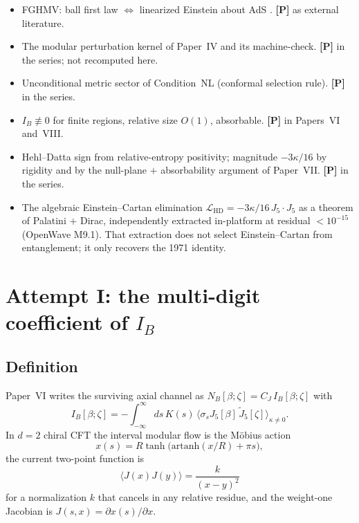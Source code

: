 \documentclass[11pt]{article}
\theoremstyle{definition}
\newcommand{\pP}{\textbf{[P]}}
\newcommand{\IB}{I_B}
\newcommand{\LHD}{\mathcal{L}_{\mathrm{HD}}}
\begin{document}
\begin{itemize}[leftmargin=1.4em]
\item FGHMV: ball first law $\Leftrightarrow$ linearized Einstein about
AdS \cite{FGHMV2014}. \pP{} as external literature.
\item The modular perturbation kernel of Paper~IV and its
machine-check. \pP{} in the series; not recomputed here.
\item Unconditional metric sector of Condition~NL (conformal selection
rule). \pP{} in the series.
\item $\IB\not\equiv 0$ for finite regions, relative size $O(1)$,
absorbable. \pP{} in Papers~VI and~VIII.
\item Hehl--Datta sign from relative-entropy positivity; magnitude
$-3\kappa/16$ by rigidity and by the null-plane $+$ absorbability
argument of Paper~VII. \pP{} in the series.
\item The algebraic Einstein--Cartan elimination
$\LHD=-3\kappa/16\,J_5\cdot J_5$ as a theorem of Palatini $+$ Dirac,
independently extracted in-platform at residual $<10^{-15}$
(OpenWave M9.1). That extraction does not select Einstein--Cartan
from entanglement; it only recovers the 1971 identity.
\end{itemize}

\section{Attempt I: the multi-digit coefficient of $\IB$}
\label{sec:ib}

\subsection{Definition}

Paper~VI writes the surviving axial channel as
$N_B[\beta;\zeta]=C_J\,\IB[\beta;\zeta]$ with
\begin{equation}
\IB[\beta;\zeta]
=
-\int_{-\infty}^{\infty} ds\,
K(s)\,
\bigl\langle
\sigma_s J_5[\beta]\,
\widetilde{J}_5[\zeta]
\bigr\rangle_{\kappa\neq 0}.
\label{eq:IB}
\end{equation}
In $d=2$ chiral CFT the interval modular flow is the M\"obius action
\cite{McGwierVI}
\begin{equation}
x(s)=R\tanh\bigl(\mathrm{artanh}(x/R)+\pi s\bigr),
\label{eq:flow}
\end{equation}
the current two-point function is
\begin{equation}
\langle J(x)J(y)\rangle = \frac{k}{(x-y)^2}
\label{eq:JJ}
\end{equation}
for a normalization $k$ that cancels in any relative residue, and the
weight-one Jacobian is $J(s,x)=\partial x(s)/\partial x$.
\end{document}

